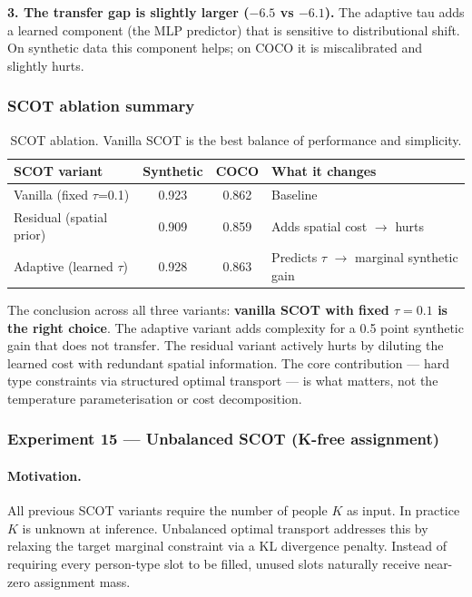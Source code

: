 \textbf{3. The transfer gap is slightly larger ($-6.5$ vs $-6.1$).} The adaptive tau adds a learned component (the MLP predictor) that is sensitive to distributional shift. On synthetic data this component helps; on COCO it is miscalibrated and slightly hurts.


\subsubsection{SCOT ablation summary}

\begin{table}[H]
\centering
\footnotesize
\begin{tabular}{lccl}
\toprule
SCOT variant & Synthetic & COCO & What it changes \\
\midrule
Vanilla (fixed $\tau$=0.1) & 0.923 & 0.862 & Baseline \\
Residual (spatial prior) & 0.909 & 0.859 & Adds spatial cost $\to$ hurts \\
Adaptive (learned $\tau$) & 0.928 & 0.863 & Predicts $\tau$ $\to$ marginal synthetic gain \\
\bottomrule
\end{tabular}
\caption{SCOT ablation. Vanilla SCOT is the best balance of performance and simplicity.}
\end{table}

The conclusion across all three variants: \textbf{vanilla SCOT with fixed $\tau = 0.1$ is the right choice}. The adaptive variant adds complexity for a 0.5 point synthetic gain that does not transfer. The residual variant actively hurts by diluting the learned cost with redundant spatial information. The core contribution --- hard type constraints via structured optimal transport --- is what matters, not the temperature parameterisation or cost decomposition.


\subsubsection{Experiment 15 --- Unbalanced SCOT (K-free assignment)}

\paragraph{Motivation.}

All previous SCOT variants require the number of people $K$ as input. In practice $K$ is unknown at inference. Unbalanced optimal transport addresses this by relaxing the target marginal constraint via a KL divergence penalty. Instead of requiring every person-type slot to be filled, unused slots naturally receive near-zero assignment mass.

